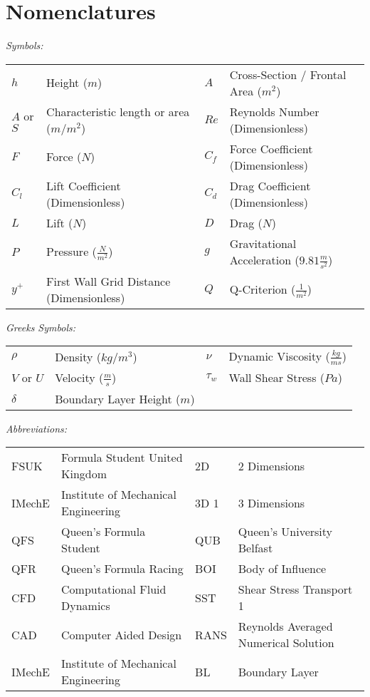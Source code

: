 \newpage
\thispagestyle{empty}
\section*{Nomenclatures} 
\flushleft
\begin{doublespace}
\textit{Symbols:}

\begin{tabular}{l l  l l }
$h$ & Height ($m$) & $A$ & Cross-Section / Frontal Area ($m^2$) \\
$A$ or $S$ & Characteristic length or area ($m$/$m^2$) & $Re$ & Reynolds Number (Dimensionless) \\
$F$ & Force ($N$) & $C_f$ & Force Coefficient (Dimensionless)\\
$C_l$ & Lift Coefficient (Dimensionless) & $C_d$ & Drag Coefficient (Dimensionless) \\
$L$ & Lift ($N$) & $D$ & Drag ($N$) \\
$P$ & Pressure ($\frac{N}{m^2}$) & $g$ & Gravitational Acceleration ($9.81\frac{m}{s^2}$)\\
$y^+$ & First Wall Grid Distance (Dimensionless) & $Q$ & Q-Criterion ($\frac{1}{m^2}$) \\
\end{tabular}

\textit{Greeks Symbols:}

\begin{tabular}{llll}
$\rho$ & Density ($kg/m^3$) & $\nu$ & Dynamic Viscosity ($\frac{kg}{ms}$) \\
$V$ or $U$ & Velocity ($\frac{m}{s}$) & $\tau_w$ & Wall Shear Stress ($Pa$)\\
$\delta$ & Boundary Layer Height ($m$) \\
\end{tabular}


\textit{Abbreviations:}

\begin{tabular}{llll}
FSUK & Formula Student United Kingdom & 2D & 2 Dimensions \\
IMechE & Institute of Mechanical Engineering & 3D 1 & 3 Dimensions\\
QFS & Queen's Formula Student & QUB & Queen's University Belfast\\
QFR & Queen's Formula Racing & BOI & Body of Influence\\
CFD & Computational Fluid Dynamics & SST & Shear Stress Transport 1\\
CAD & Computer Aided Design & RANS & Reynolds Averaged Numerical Solution\\
IMechE & Institute of Mechanical Engineering & BL & Boundary Layer\\
\end{tabular}
\end{doublespace}